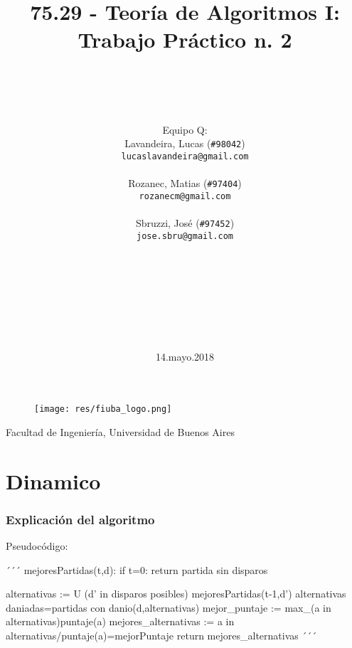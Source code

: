 \documentclass{article}
\title{75.29 - Teoría de Algoritmos I: Trabajo Práctico n. 2}
\author{
    \\\\\\\\
    \Large{Equipo Q:}\\
    Lavandeira, Lucas (\texttt{\#98042})\\\texttt{lucaslavandeira@gmail.com}\\
    \\
    Rozanec, Matias (\texttt{\#97404})\\\texttt{rozanecm@gmail.com}\\
    \\
    Sbruzzi, José (\texttt{\#97452})\\\texttt{jose.sbru@gmail.com}\\
    \\\\\\\\\\\\\\
}
\date{14.mayo.2018}
\begin{document}
\maketitle
\begin{figure}[!htp]
    \centering
    \texttt{[image: res/fiuba\_logo.png]} 
\end{figure}
\begin{center}\normalsize{Facultad de Ingeniería, Universidad de Buenos Aires}\end{center}
\newpage

\tableofcontents
\newpage





\part{Dinamico}
\section{Explicación del algoritmo}

Pseudocódigo:

´´´
mejoresPartidas(t,d):
    if t=0:
        return partida sin disparos

    alternativas := U (d' in disparos posibles) mejoresPartidas(t-1,d')
    alternativas daniadas=partidas con danio(d,alternativas)
    mejor_puntaje := max_(a in alternativas){puntaje(a)}
    mejores_alternativas := {a in alternativas/puntaje(a)=mejorPuntaje}
    return mejores_alternativas
´´´
\end{document}
